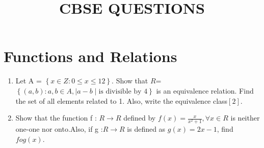 \documentclass{article}
\providecommand{\sbrak}[1]{\ensuremath{{}\left[#1\right]}}
\providecommand{\brak}[1]{\ensuremath{\left(#1\right)}}
\providecommand{\cbrak}[1]{\ensuremath{\left\{#1\right\}}}
\begin{document}
\title{\textbf{CBSE QUESTIONS}}
\date{}
\maketitle{}
\section{Functions and Relations}
\begin{enumerate}
\item Let A = $\cbrak{x \in Z: 0\le x \le 12}$. Show that $R$=$\cbrak{\brak{a,b}: a,b \in A,\mid a-b \mid \text{is divisible by } 4 }$ is an equivalence relation. Find the set of all elements related to 1. Also, write the equivalence class\sbrak 2.
\item Show that the function f : \(R \longrightarrow R\) defined by $f\brak{x} = \frac{x}{x^2 + 1} , \forall x \in R $ is neither one-one nor onto.Also, if g :\(R\longrightarrow R\) is defined as $ g\brak{x} =2x - 1$, find $fog (x)$.
\end{enumerate}
\end{document}
